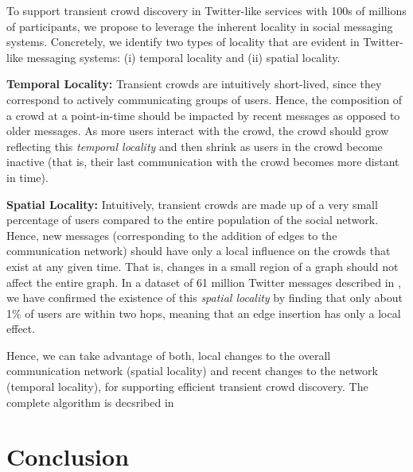 \documentclass{sig-alternate}
\begin{document}
To support transient crowd discovery in Twitter-like services with 100s of
millions of participants, we propose to leverage the inherent locality in social
messaging systems. Concretely, we identify two types of locality that are
evident in Twitter-like messaging systems: (i) temporal locality and (ii) spatial
locality.

\medskip \noindent\textbf{Temporal Locality:} Transient crowds are
intuitively short-lived, since they correspond to actively communicating groups
of users. Hence, the composition of a crowd at a point-in-time should be impacted
by recent messages as opposed to older messages. As more users interact with the
crowd, the crowd should grow reflecting this \textit{temporal locality} and then
shrink as users in the crowd become inactive (that is, their last communication
with the crowd becomes more distant in time).

\medskip \noindent \textbf{Spatial Locality:} Intuitively, transient crowds are
made up of a very small percentage of users compared to the entire population of
the social network. Hence, new messages (corresponding to the addition of edges
to the communication network) should have only a local influence on the crowds
that exist at any given time. That is, changes in a small region of a graph
should not affect the entire graph. In a dataset of 61 million Twitter messages
described in \cite{Kamath:2011:TCD}, we have confirmed the existence of
this \textit{spatial locality} by finding that only about 1\% of users are within
two hops, meaning that an edge insertion has only a local effect.

\medskip Hence, we can take advantage of both, local changes to the overall
communication network (spatial locality) and recent changes to the network
(temporal locality), for supporting efficient transient crowd discovery. The complete algorithm is decsribed in \cite{Kamath:2011:TCD}

\section{Conclusion}
\label{sec:conclusion}
\end{document}
